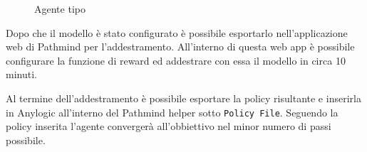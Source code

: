 \begin{figure}[!h]
    \centering
    \caption{Agente tipo}
    \label{fig:debugfig}
\end{figure}

Dopo che il modello è stato configurato è possibile esportarlo nell'applicazione web di Pathmind per l'addestramento. All'interno di questa web app è possibile configurare la funzione di reward ed addestrare con essa il modello in circa 10 minuti. 

Al termine dell'addestramento è possibile esportare la policy risultante e inserirla in Anylogic all'interno del Pathmind helper sotto \texttt{Policy File}. Seguendo la policy inserita l'agente convergerà all'obbiettivo nel minor numero di passi possibile.







